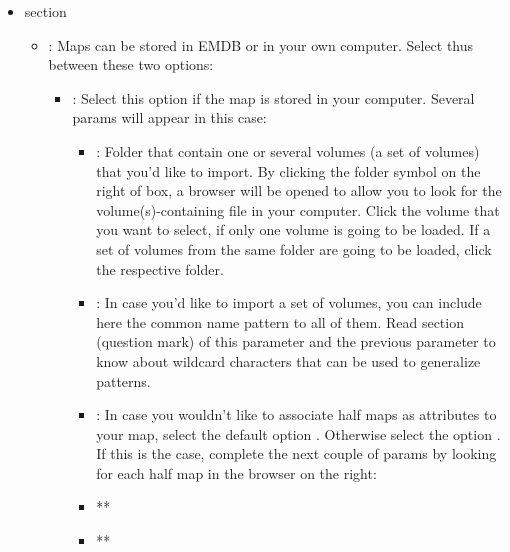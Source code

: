 \begin{itemize}
   \item {} section
  

        \begin{itemize}
        \item {}: Maps can be stored in EMDB or in your own computer. Select thus between these two options:
                    \begin{itemize}
                    \item {}: Select this option if the map is stored in your computer. Several params will appear in this case:\\
                                \begin{itemize}
                                \item {}: Folder that contain one or several volumes (a set of volumes) that you'd like to import. By clicking the folder symbol on the right of  box, a browser will be opened to allow you to look for the volume(s)-containing file in your computer. Click the volume that you want to select, if only one volume is going to be loaded. If a set of volumes from the same folder are going to be loaded, click the respective folder.
                                \item {}: In case you'd like to import a set of volumes, you can include here the common name pattern to all of them. Read  section (question mark) of this parameter and the previous parameter  to know about wildcard characters that can be used to generalize patterns.
                                \item {}: In case you wouldn't like to associate half maps as attributes to your map, select the default option . Otherwise select the option . If this is the case, complete the next couple of params by looking for each half map in the browser on the right:
                                    
                                    \item ** 
                                    \item ** 
                                    

\end{itemize}
\end{itemize}
\end{itemize}
\end{itemize}
